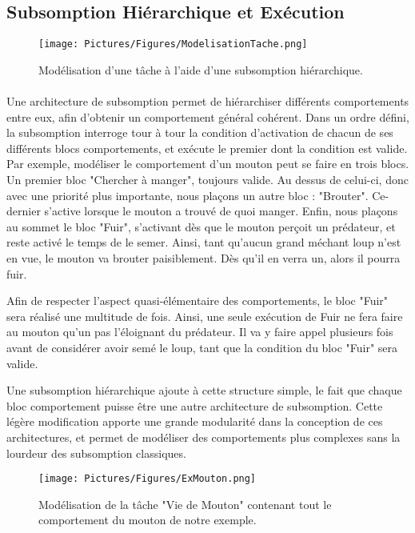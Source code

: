 		\subsection{Subsomption Hiérarchique et Exécution}
			
			\begin{figure}
			\centering
			\texttt{[image: Pictures/Figures/ModelisationTache.png]}
			\caption{Modélisation d'une tâche à l'aide d'une subsomption hiérarchique.}
			\label{ModelisationTache}
			\end{figure}
		\paragraph{}
		
			Une architecture de subsomption permet de hiérarchiser différents comportements entre eux, afin d'obtenir un comportement général cohérent\cite{brooks_robust_1986}. Dans un ordre défini, la subsomption interroge tour à tour la condition d'activation de chacun de ses différents blocs comportements, et exécute le premier dont la condition est valide. Par exemple, modéliser le comportement d'un mouton peut se faire en trois blocs. Un premier bloc "Chercher à manger", toujours valide. Au dessus de celui-ci, donc avec une priorité plus importante, nous plaçons un autre bloc : "Brouter". Ce-dernier s'active lorsque le mouton a trouvé de quoi manger. Enfin, nous plaçons au sommet le bloc "Fuir", s'activant dès que le mouton perçoit un prédateur, et reste activé le temps de le semer. Ainsi, tant qu'aucun grand méchant loup n'est en vue, le mouton va brouter paisiblement. Dès qu'il en verra un, alors il pourra fuir.
			
			Afin de respecter l'aspect quasi-élémentaire des comportements, le bloc "Fuir" sera réalisé une multitude de fois. Ainsi, une seule exécution de Fuir ne fera faire au mouton qu'un pas l'éloignant du prédateur. Il va y faire appel plusieurs fois avant de considérer avoir semé le loup, tant que la condition du bloc "Fuir" sera valide.
			
			Une subsomption hiérarchique ajoute à cette structure simple, le fait que chaque bloc comportement puisse être une autre architecture de subsomption\cite{heckel_representational_2010}. Cette légère modification apporte une grande modularité dans la conception de ces architectures, et permet de modéliser des comportements plus complexes sans la lourdeur des subsomption classiques.
			
			\begin{figure}
			\centering
			\texttt{[image: Pictures/Figures/ExMouton.png]}
			\caption{Modélisation de la tâche "Vie de Mouton" contenant tout le comportement du mouton de notre exemple.}
			\label{TacheMouton}
			\end{figure}
			
